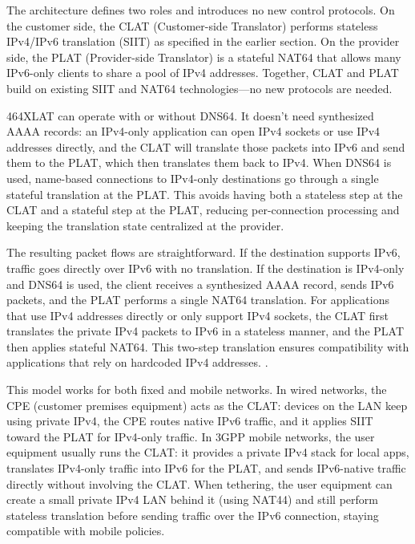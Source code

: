 The architecture defines two roles and introduces no new control protocols. 
On the customer side, the CLAT (Customer-side Translator) performs stateless IPv4/IPv6 translation (SIIT) as specified in the earlier section.
On the provider side, the PLAT (Provider-side Translator) is a stateful NAT64 that allows many IPv6-only clients to share a pool of IPv4 addresses. Together, CLAT and PLAT build on existing SIIT and NAT64 technologies—no new protocols are needed\cite{rfc6877}.

464XLAT can operate with or without DNS64. It doesn’t need synthesized AAAA records: an IPv4-only application can open IPv4 sockets or use IPv4 addresses directly, and the CLAT will translate those packets into IPv6 and send them to the PLAT, which then translates them back to IPv4. When DNS64 is used, name-based connections to IPv4-only destinations go through a single stateful translation at the PLAT. This avoids having both a stateless step at the CLAT and a stateful step at the PLAT, reducing per-connection processing and keeping the translation state centralized at the provider\cite{rfc6877}.

The resulting packet flows are straightforward. If the destination supports IPv6, traffic goes directly over IPv6 with no translation. If the destination is IPv4-only and DNS64 is used, the client receives a synthesized AAAA record, sends IPv6 packets, and the PLAT performs a single NAT64 translation. For applications that use IPv4 addresses directly or only support IPv4 sockets, the CLAT first translates the private IPv4 packets to IPv6 in a stateless manner, and the PLAT then applies stateful NAT64. This two-step translation ensures compatibility with applications that rely on hardcoded IPv4 addresses. \cite{rfc6877}.

This model works for both fixed and mobile networks. In wired networks, the CPE (customer premises equipment) acts as the CLAT: devices on the LAN keep using private IPv4, the CPE routes native IPv6 traffic, and it applies SIIT toward the PLAT for IPv4-only traffic. In 3GPP mobile networks, the user equipment usually runs the CLAT: it provides a private IPv4 stack for local apps, translates IPv4-only traffic into IPv6 for the PLAT, and sends IPv6-native traffic directly without involving the CLAT. When tethering, the user equipment can create a small private IPv4 LAN behind it (using NAT44) and still perform stateless translation before sending traffic over the IPv6 connection, staying compatible with mobile policies\cite{rfc6877}.

